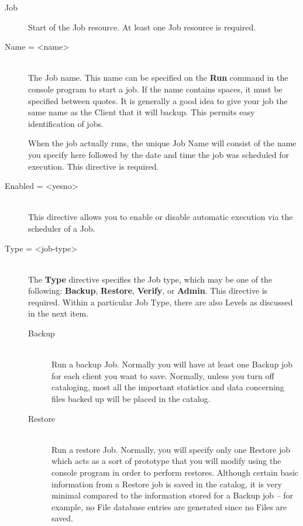 \begin{description}

\item [Job]
Start of the Job resource. At least one Job  resource is required.

\item [Name = {\textless}name{\textgreater}] \hfill \\
The Job name. This name can be specified  on the {\bf Run} command in the
console program to start a job. If the  name contains spaces, it must be
specified between quotes. It is  generally a good idea to give your job the
same name as the Client  that it will backup. This permits easy
identification of jobs.

When the job actually runs, the unique Job Name will consist  of the name you
specify here followed by the date and time the  job was scheduled for
execution. This directive is required.

\item [Enabled = {\textless}yes{\textbar}no{\textgreater}] \hfill \\
  This directive allows you to enable or disable automatic execution
  via the scheduler of a Job.

\item [Type = {\textless}job-type{\textgreater}] \hfill \\
The {\bf Type} directive specifies  the Job type, which may be one of the
following: {\bf Backup},  {\bf Restore}, {\bf Verify}, or {\bf Admin}. This
directive  is required. Within a particular Job Type, there are also Levels
as discussed in the next item.

\begin{description}

\item [Backup] \hfill \\
Run a backup Job. Normally you will  have at least one Backup job for each
client you want  to save. Normally, unless you turn off cataloging,  most all
the important statistics and data concerning  files backed up will be placed
in the catalog.

\item [Restore] \hfill \\
Run a restore Job.  Normally, you will specify only one Restore job
which acts as a sort of prototype that you will modify using the console
program in order to perform restores.  Although certain basic
information from a Restore job is saved in the catalog, it is very
minimal compared to the information stored for a Backup job -- for
example, no File database entries are generated since no Files are
saved.


\end{description}
\end{description}
